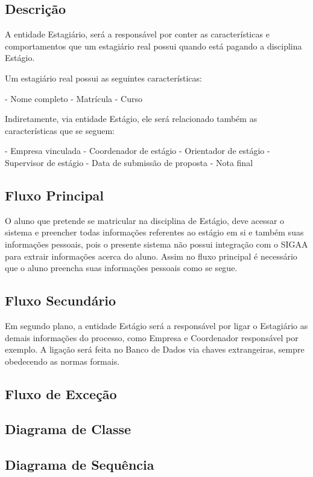 \subsection{Descrição}
A entidade Estagiário, será a responsável por conter as características e comportamentos que um estagiário real possui quando está pagando a disciplina Estágio.

Um estagiário real possui as seguintes características:

- Nome completo
- Matrícula
- Curso

Indiretamente, via entidade Estágio, ele será relacionado também as características que se seguem: 

- Empresa vinculada
- Coordenador de estágio
- Orientador de estágio
- Supervisor de estágio
- Data de submissão de proposta
- Nota final

 
\subsection{Fluxo Principal}
O aluno que pretende se matricular na disciplina de Estágio, deve acessar o sistema e preencher todas informações referentes ao estágio em si e também suas informações pessoais, pois o
presente sistema não possui integração com o SIGAA para extrair informações acerca do aluno. Assim no fluxo principal é necessário que o aluno preencha suas informações pessoais como se segue.



\subsection{Fluxo Secundário}
Em segundo plano, a entidade Estágio será a responsável por ligar o Estagiário as demais informações do processo, como Empresa e Coordenador responsável por exemplo.
A ligação será feita no Banco de Dados via chaves extrangeiras, sempre obedecendo as normas formais. 


\subsection{Fluxo de Exceção}

\subsection{Diagrama de Classe}

\subsection{Diagrama de Sequência}